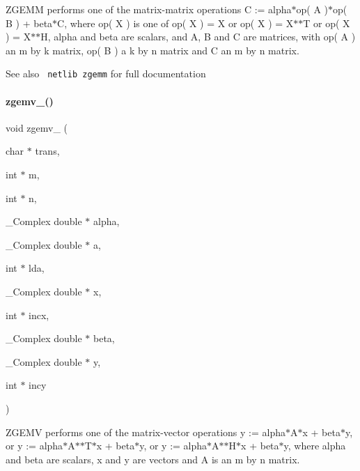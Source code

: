 Z\+G\+E\+MM performs one of the matrix-\/matrix operations C \+:= alpha$\ast$op( A )$\ast$op( B ) + beta$\ast$C, where op( X ) is one of op( X ) = X or op( X ) = X$\ast$$\ast$T or op( X ) = X$\ast$$\ast$H, alpha and beta are scalars, and A, B and C are matrices, with op( A ) an m by k matrix, op( B ) a k by n matrix and C an m by n matrix. \begin{DoxySeeAlso}{See also}
{\texttt{ netlib zgemm}} for full documentation 
\end{DoxySeeAlso}
\mbox{\label{blas_8h_ac049eb291e4fd87095c07bd9fcd7b069}} 
\paragraph{zgemv\_()}
{\footnotesize\ttfamily void zgemv\+\_\+ (\begin{DoxyParamCaption}\item[{char $\ast$}]{trans,  }\item[{int $\ast$}]{m,  }\item[{int $\ast$}]{n,  }\item[{\+\_\+\+Complex double $\ast$}]{alpha,  }\item[{\+\_\+\+Complex double $\ast$}]{a,  }\item[{int $\ast$}]{lda,  }\item[{\+\_\+\+Complex double $\ast$}]{x,  }\item[{int $\ast$}]{incx,  }\item[{\+\_\+\+Complex double $\ast$}]{beta,  }\item[{\+\_\+\+Complex double $\ast$}]{y,  }\item[{int $\ast$}]{incy }\end{DoxyParamCaption})}

Z\+G\+E\+MV performs one of the matrix-\/vector operations y \+:= alpha$\ast$\+A$\ast$x + beta$\ast$y, or y \+:= alpha$\ast$\+A$\ast$$\ast$\+T$\ast$x + beta$\ast$y, or y \+:= alpha$\ast$\+A$\ast$$\ast$\+H$\ast$x + beta$\ast$y, where alpha and beta are scalars, x and y are vectors and A is an m by n matrix. \mbox{\label{blas_8h_aa0defc808d7ec4b2f69e532f0e277bac}} 
